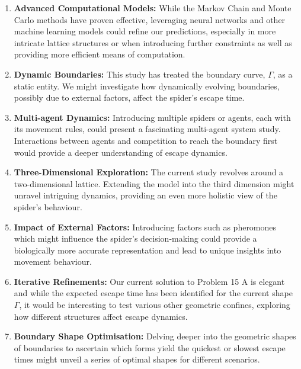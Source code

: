 \documentclass[12pt,a4paper]{article}
\begin{document}
\begin{enumerate}
    \item \textbf{Advanced Computational Models:} While the Markov Chain and Monte Carlo methods have proven effective, leveraging neural networks and other machine learning models could refine our predictions, especially in more intricate lattice structures or when introducing further constraints as well as providing more efficient means of computation.
    
    \item \textbf{Dynamic Boundaries:} This study has treated the boundary curve, \(\Gamma\), as a static entity. We might investigate how dynamically evolving boundaries, possibly due to external factors, affect the spider's escape time.
    
    \item \textbf{Multi-agent Dynamics:} Introducing multiple spiders or agents, each with its movement rules, could present a fascinating multi-agent system study. Interactions between agents and competition to reach the boundary first would provide a deeper understanding of escape dynamics.
    
    \item \textbf{Three-Dimensional Exploration:} The current study revolves around a two-dimensional lattice. Extending the model into the third dimension might unravel intriguing dynamics, providing an even more holistic view of the spider's behaviour.
    
    \item \textbf{Impact of External Factors:} Introducing factors such as pheromones which might influence the spider's decision-making could provide a biologically more accurate representation and lead to unique insights into movement behaviour.
    
    \item \textbf{Iterative Refinements:} Our current solution to Problem 15 A is elegant and while the expected escape time has been identified for the current shape \(\Gamma\), it would be interesting to test various other geometric confines, exploring how different structures affect escape dynamics.
    
    \item \textbf{Boundary Shape Optimisation:} Delving deeper into the geometric shapes of boundaries to ascertain which forms yield the quickest or slowest escape times might unveil a series of optimal shapes for different scenarios.
\end{enumerate}
\end{document}
